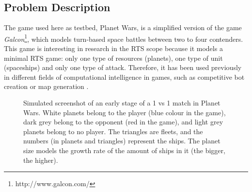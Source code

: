 \documentclass[conference]{IEEEtran}
\begin{document}

%
%

\subsection{Problem Description} %
\label{sec:problemDescription}

The game used here as testbed, Planet Wars, is a simplified version of the game
{\em Galcon}\footnote{http://www.galcon.com/},
which models turn-based space battles between two to four
contenders. This game is interesting in research in the RTS scope because it models a minimal RTS game: only one type of resources (planets), one type of unit (spaceships) and only one type of attack. Therefore, it has been used previously in different fields of computational intelligence in games, such as competitive bot creation \cite{ziolko2012automatic,NogueiraCoevolutionary14} or map generation \cite{LaraMaps14,LaraCabrera2014aesthetic}.


\begin{figure}[htb]
\tiny
\begin{center}
\end{center}
\caption{Simulated screenshot of an early stage of a 1 vs 1 match in Planet Wars. White planets belong to the player (blue colour in the game), dark grey belong to the opponent (red in the game), and light grey planets belong to no player. The triangles are fleets, and the numbers (in planets and triangles) represent the ships. The planet size models the growth rate of the amount of ships in it (the bigger, the higher).}
\label{figura:PlanetWars1}
\end{figure}
\end{document}

